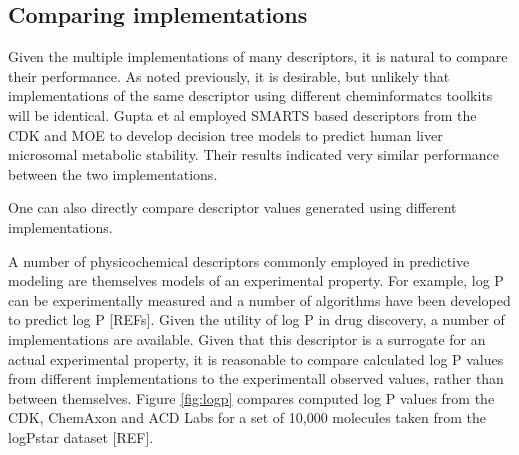\documentclass[letterpaper, 12pt]{article}
\begin{document}
\subsection{Comparing implementations}
\label{sec:comp-impl}


Given the multiple implementations of many descriptors, it is natural
to compare their performance. As noted previously, it is desirable,
but unlikely that implementations of the same descriptor using
different cheminformatcs toolkits will be identical. Gupta et al
employed SMARTS based descriptors from the CDK and MOE to develop
decision tree models to predict human liver microsomal metabolic
stability\cite{Gupta:2010uq}. Their results indicated very similar
performance between the two implementations. 

One can also directly compare descriptor values generated using
different implementations. 

A number of physicochemical descriptors commonly employed in
predictive modeling are themselves models of an experimental
property. For example, log P can be experimentally measured and a
number of algorithms have been developed to predict log P
[REFs]. Given the utility of log P in drug discovery, a number of
implementations are available. Given that this descriptor is a
surrogate for an actual experimental property, it is reasonable to
compare calculated log P values from different implementations to the
experimentall observed values, rather than between themselves. Figure
\ref{fig:logp} compares computed log P values from the CDK, ChemAxon
and ACD Labs for a set of 10,000 molecules taken from the logPstar
dataset [REF].
\end{document}
